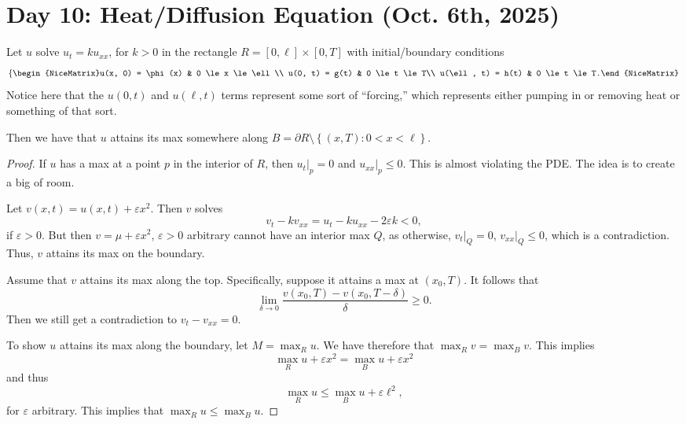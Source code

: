 \section{Day 10: Heat/Diffusion Equation (Oct. 6th, 2025)}

\begin{theorem}
	Let \( u \) solve \( u_{t} = ku_{x x} \), for \( k > 0 \) in the rectangle \( R = [0, \ell] \times [0, T] \) with initial/boundary conditions
	\[ \left\{\begin{NiceMatrix}u(x, 0) = \phi(x) & 0 \le x \le \ell \\ u(0, t) = g(t) & 0 \le t \le T\\ u(\ell, t) = h(t) & 0 \le t \le T.\end{NiceMatrix}\right.  \]
	Notice here that the \( u(0, t) \) and \( u(\ell, t) \) terms represent some sort of ``forcing,'' which represents either pumping in or removing heat or something of that sort.

	Then we have that \( u \) attains its max somewhere along \( B = \partial R \setminus \left\{ (x, T) : 0 < x < \ell \right\} \).
\end{theorem}
\begin{proof}
	If \( u \) has a max at a point \( p \) in the interior of \( R \), then \( u_{t}|_{p} = 0 \) and \( u_{x x}|_{p} \le 0 \). This is almost violating the PDE. The idea is to create a big of room.

	Let \( v(x, t) = u(x, t) + \varepsilon x^{2} \). Then \( v \) solves
	\[ v_{t} - k v_{x x} = u_{t} - k u_{x x} - 2 \varepsilon k < 0, \]
	if \( \varepsilon > 0 \). But then \( v = \mu + \varepsilon x^{2}  \), \( \varepsilon > 0 \) arbitrary cannot have an interior max \( Q \), as otherwise, \( v_{t}|_{Q} = 0 \), \( v_{x x}|_{Q} \le 0  \), which is a contradiction. Thus, \( v \) attains its max on the boundary.

	Assume that \( v \) attains its max along the top. Specifically, suppose it attains a max at \( (x_{0}, T) \). It follows that
	\[ \lim_{\delta \to 0} \frac{v(x_{0}, T) - v(x_{0}, T - \delta)}{\delta} \ge 0. \]
	Then we still get a contradiction to \( v_{t} - v_{x x} = 0 \).

	To show \( u \) attains its max along the boundary, let \( M = \max_{R} u \). We have therefore that \( \max_{R} v = \max_{B} v \). This implies
	\[ \max_{R} u + \varepsilon x^{2} = \max_{B} u + \varepsilon x^{2} \]
	and thus
	\[ \max_{R} u \le \max_{B} u + \varepsilon \ell^{2}, \]
	for \( \varepsilon \) arbitrary. This implies that \( \max_{R} u \le \max_{B}u \).
\end{proof}


